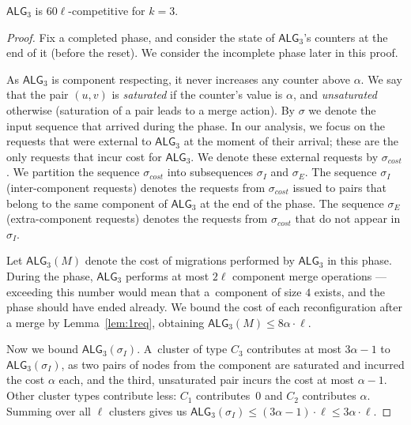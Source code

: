 \documentclass[a4paper,anonymous,USenglish]{lipics-v2019}
\newcommand{\TAlg}{{\ensuremath{\textsf{ALG}_{3}}}\xspace}
\begin{document}
\begin{theorem}
	\TAlg is $60\ell$-competitive for $k=3$.
\end{theorem}
\begin{proof}
	Fix a completed phase, and consider the state of \TAlg's counters at the end of it (before the reset).
	We consider the incomplete phase later in this proof.
	
	As \TAlg is component respecting, it never increases any counter above $\alpha$.
	We say that the pair $(u, v)$ is \emph{saturated} if the counter's value is $\alpha$, and \emph{unsaturated} otherwise (saturation of a pair leads to a merge action).
	By $\sigma$ we denote the input sequence that arrived during the phase.
	In our analysis, we focus on the requests that were external to \TAlg at the moment of their arrival; these are the only requests that incur cost for \TAlg.
	We denote these external requests by $\sigma_{cost}$.
	We partition the sequence $\sigma_{cost}$ into subsequences $\sigma_I$ and $\sigma_E$.
	The sequence $\sigma_I$ (inter-component requests) denotes the requests from $\sigma_{cost}$ issued to pairs that belong to the same component of \TAlg at the end of the phase.
	The sequence $\sigma_E$ (extra-component requests) denotes the requests from $\sigma_{cost}$ that do not appear in $\sigma_I$.
	
	
	Let $\TAlg(M)$ denote the cost of migrations performed by \TAlg in this phase.
	During the phase, \TAlg performs at most $2 \ell$ component merge operations ---
	exceeding this number would mean that a~component of size $4$ exists, and the phase should have ended already.
	We bound the cost of each reconfiguration after a merge by Lemma~\ref{lem:1req}, obtaining $\TAlg(M) \leq 8\alpha\cdot\ell$.
	
	Now we bound $\TAlg(\sigma_I)$.
	A~cluster of type $C_3$ contributes at most $3 \alpha - 1$ to $\TAlg(\sigma_I)$, as two pairs of nodes from the component are saturated and incurred the cost $\alpha$ each, and the third, unsaturated pair incurs the cost at most $\alpha-1$.
	Other cluster types contribute less: $C_1$ contributes~$0$ and $C_2$ contributes $\alpha$.
	Summing over all $\ell$ clusters gives us $\TAlg(\sigma_I) \leq (3 \alpha-1)\cdot \ell \leq 3\alpha\cdot\ell$.
	

\end{proof}
\end{document}
